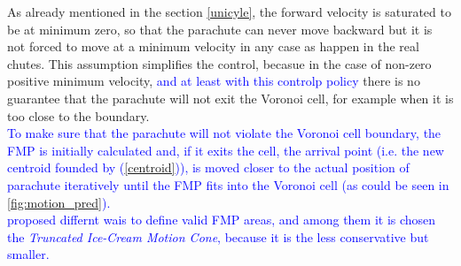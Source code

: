 As already mentioned in the section \ref{unicyle}, the forward velocity is saturated to be at minimum zero, so that the parachute can never move backward but it is not forced to move at a minimum velocity in any case as happen in the real chutes. This assumption simplifies the control, becasue in the case of non-zero positive minimum velocity, \textcolor{blue}{and at least with this controlp policy} there is no guarantee that the parachute will not exit the Voronoi cell, for example when it is too close to the boundary.\\
\textcolor{blue}{To make sure that the parachute will not violate the Voronoi cell boundary, the FMP is initially calculated and, if it exits the cell, the arrival point (i.e. the new centroid founded by (\ref{centroid})), is moved closer to the actual position of parachute iteratively until the FMP fits into the Voronoi cell (as could be seen in \autoref{fig:motion_pred}).\\
\cite{b4} proposed differnt wais to define valid FMP areas, and among them it is chosen the \textit{Truncated Ice-Cream Motion Cone}, because it is the less conservative but smaller.}